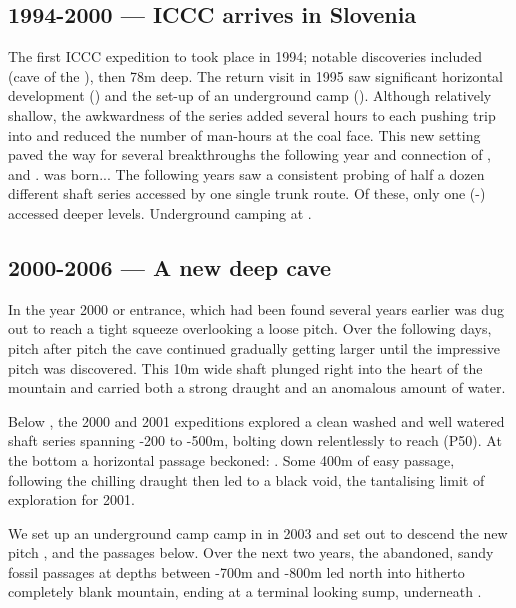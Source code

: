 \subsection{1994-2000 --- ICCC arrives in Slovenia} The first ICCC expedition to  took place in 1994; notable discoveries included  (cave of the ), then 78m deep. The return visit in 1995 saw significant horizontal development () and the set-up of an underground camp (). Although relatively shallow, the awkwardness of the  series added several hours to each pushing trip into  and reduced the number of man-hours at the coal face.
This new setting paved the way for several breakthroughs the following year and connection of ,  and .   was born... The following years saw a consistent probing of half a dozen different shaft series accessed by one single trunk route. Of these, only one (-) accessed deeper levels. Underground camping at .

\subsection{2000-2006 --- A new deep cave}

\label{sec:early vrtnarija}

 In the year 2000  or  entrance, which had been found several years earlier was dug out to reach a tight squeeze overlooking a loose pitch. Over the following days, pitch after pitch the cave continued gradually getting larger until the impressive  pitch was discovered. This 10m wide shaft plunged right into the heart of the mountain and carried both a strong draught and an anomalous amount of water. 

Below , the 2000 and 2001 expeditions explored a clean washed and well watered shaft series spanning -200 to -500m,  bolting down relentlessly to reach  (P50). At the bottom a horizontal passage beckoned: . Some 400m of easy passage, following the chilling draught then led to a black void, the tantalising limit of exploration for 2001.
    
We set up an underground camp camp in  in 2003 and set out to descend the new pitch , and the passages below. Over the next two years, the abandoned, sandy fossil passages at depths between -700m and -800m led north into hitherto completely blank mountain, ending at a terminal looking sump, underneath .

